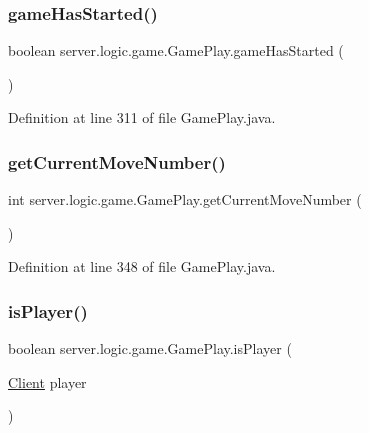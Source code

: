 \subsubsection{\texorpdfstring{game\+Has\+Started()}{gameHasStarted()}}
{\footnotesize\ttfamily boolean server.\+logic.\+game.\+Game\+Play.\+game\+Has\+Started (\begin{DoxyParamCaption}{ }\end{DoxyParamCaption})}



Definition at line 311 of file Game\+Play.\+java.

\hypertarget{classserver_1_1logic_1_1game_1_1_game_play_a43686e264eac3183ad9df3e9ce675178}{}\label{classserver_1_1logic_1_1game_1_1_game_play_a43686e264eac3183ad9df3e9ce675178} 
\subsubsection{\texorpdfstring{get\+Current\+Move\+Number()}{getCurrentMoveNumber()}}
{\footnotesize\ttfamily int server.\+logic.\+game.\+Game\+Play.\+get\+Current\+Move\+Number (\begin{DoxyParamCaption}{ }\end{DoxyParamCaption})}



Definition at line 348 of file Game\+Play.\+java.

\hypertarget{classserver_1_1logic_1_1game_1_1_game_play_adbf208846bbafa06fbd86f5addfe171f}{}\label{classserver_1_1logic_1_1game_1_1_game_play_adbf208846bbafa06fbd86f5addfe171f} 
\subsubsection{\texorpdfstring{is\+Player()}{isPlayer()}}
{\footnotesize\ttfamily boolean server.\+logic.\+game.\+Game\+Play.\+is\+Player (\begin{DoxyParamCaption}\item[{\hyperlink{classserver_1_1conn_1_1_client}{Client}}]{player }\end{DoxyParamCaption})}



